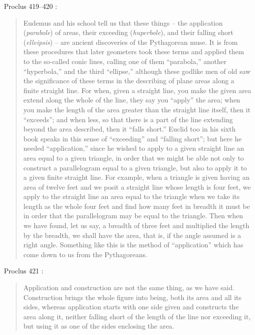 \documentclass{article}
\begin{document}
Proclus 419--420 \cite[pp.~332--333]{proclus}:

\begin{quote}
Eudemus and his school tell us that these things -- the
application ({\em parabole}) of areas, their exceeding ({\em huperbole}),
and their falling short ({\em elleipsis}) -- are ancient discoveries of
the Pythagorean muse. It is from these procedures that later
geometers took these terms and applied them to the so-called
conic lines, calling one of them ``parabola,'' another ``hyperbola,''
and the third ``ellipse,'' although these godlike men
of old saw the significance of these terms in the describing of
plane areas along a finite straight line. For when, given a
straight line, you make the given area extend along the whole
of the line, they say you ``apply'' the area; when you make
the length of the area greater than the straight line itself,
then it ``exceeds''; and when less, so that there is a part of the
line extending beyond the area described, then it ``falls
short.'' Euclid too in his sixth book speaks in this sense of
``exceeding'' and ``falling short''; but here he needed ``application,''
since he wished to apply to a given straight line
an area equal to a given triangle, in order that we might be
able not only to construct a parallelogram equal to a given
triangle, but also to apply it to a given finite straight line. For
example, when a triangle is given having an area of twelve
feet and we posit a straight line whose length is four feet, we
apply to the straight line an area equal to the triangle when
we take its length as the whole four feet and find how many
feet in breadth it must be in order that the parallelogram may
be equal to the triangle. Then when we have found, let us say,
a breadth of three feet and multiplied the length by the
breadth, we shall have the area, that is, if the angle assumed 
is a right angle. Something like this is the method of  ``application''
which has come down to us from the Pythagoreans.
\end{quote}

Proclus 421 \cite[pp.~333--334]{proclus}:

\begin{quote}
Application and construction are not the same
thing, as we have said. Construction brings the whole figure
into being, both its area and all its sides, whereas application
starts with one side given and constructs the area along it,
neither falling short of the length of the line nor exceeding it,
but using it as one of the sides enclosing the area.
\end{quote}
\end{document}
